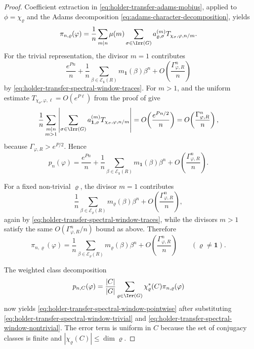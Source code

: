 \begin{proof}
  Coefficient extraction in
  \eqref{eq:holder-transfer-adams-mobius}, applied to
  \(\phi=\chi_\varrho\) and the Adams decomposition
  \eqref{eq:adams-character-decomposition}, yields
  \[
    \pi_{n,\varrho}(\varphi)
    =
    \frac{1}{n}\sum_{m\mid n}\mu(m)
      \sum_{\sigma\in\Irr(G)}
        a_{\varrho,\sigma}^{(m)}T_{\chi_\sigma,\varphi,n/m}.
  \]
  For the trivial representation, the divisor \(m=1\) contributes
  \[
    \frac{e^{Pn}}{n}
    +\frac{1}{n}
      \sum_{\beta\in\mathcal E_{\mathbf 1}(R)}
        m_{\mathbf 1}(\beta)\beta^n
    +O\!\left(\frac{\Gamma_{\varphi,R}^n}{n}\right)
  \]
  by \eqref{eq:holder-transfer-spectral-window-traces}. For \(m>1\),
   and the uniform estimate
  \(T_{\chi_\sigma,\varphi,\ell}=O(e^{P\ell})\) from the proof of
   give
  \[
    \frac{1}{n}
    \sum_{\substack{m\mid n\\ m>1}}
      \left|
        \sum_{\sigma\in\Irr(G)}
          a_{\mathbf 1,\sigma}^{(m)}
          T_{\chi_\sigma,\varphi,n/m}
      \right|
    =
    O\!\left(\frac{e^{Pn/2}}{n}\right)
    =
    O\!\left(\frac{\Gamma_{\varphi,R}^n}{n}\right),
  \]
  because \(\Gamma_{\varphi,R}>e^{P/2}\). Hence
  \begin{equation}\label{eq:holder-transfer-spectral-window-trivial}
    p_n(\varphi)
    =
    \frac{e^{Pn}}{n}
    +\frac{1}{n}
      \sum_{\beta\in\mathcal E_{\mathbf 1}(R)}
        m_{\mathbf 1}(\beta)\beta^n
    +O\!\left(\frac{\Gamma_{\varphi,R}^n}{n}\right).
  \end{equation}

  For a fixed non-trivial \(\varrho\), the divisor \(m=1\) contributes
  \[
    \frac{1}{n}
      \sum_{\beta\in\mathcal E_\varrho(R)}
        m_\varrho(\beta)\beta^n
    +O\!\left(\frac{\Gamma_{\varphi,R}^n}{n}\right),
  \]
  again by \eqref{eq:holder-transfer-spectral-window-traces}, while the
  divisors \(m>1\) satisfy the same
  \(O(\Gamma_{\varphi,R}^n/n)\) bound as above. Therefore
  \begin{equation}\label{eq:holder-transfer-spectral-window-nontrivial}
    \pi_{n,\varrho}(\varphi)
    =
    \frac{1}{n}
      \sum_{\beta\in\mathcal E_\varrho(R)}
        m_\varrho(\beta)\beta^n
    +O\!\left(\frac{\Gamma_{\varphi,R}^n}{n}\right)
    \qquad (\varrho\neq\mathbf 1).
  \end{equation}

  The weighted class decomposition
  \[
    p_{n,C}(\varphi)
    =
    \frac{|C|}{|G|}
      \sum_{\varrho\in\Irr(G)}
        \chi_\varrho^\ast(C)\pi_{n,\varrho}(\varphi)
  \]
  now yields \eqref{eq:holder-transfer-spectral-window-pointwise} after
  substituting
  \eqref{eq:holder-transfer-spectral-window-trivial} and
  \eqref{eq:holder-transfer-spectral-window-nontrivial}. The error term
  is uniform in \(C\) because the set of conjugacy classes is finite and
  \(|\chi_\varrho(C)|\le \dim\varrho\).


\end{proof}
